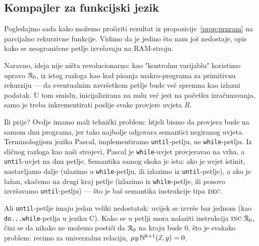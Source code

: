 
\subsection{Kompajler za funkcijski jezik}\label{sec:pir}

Pogledajmo sada kako možemo proširiti rezultat iz propozicije~\ref{prop:prnram} na parcijalno rekurzivne funkcije. Vidimo da je jedino što nam još nedostaje, opis kako se neograničene petlje izvršavaju na RAM-stroju.

Naravno, ideja nije ništa revolucionarno: kao "kontrolnu varijablu" koristimo upravo $\mathcal R_{0}$, iz istog razloga kao kod pisanja makro-programa za primitivnu rekurziju --- da eventualnim završetkom petlje bude već spremna kao izlazni podatak. U tom smislu, inicijalizirana na nulu već jest na početku izračunavanja, samo je treba inkrementirati poslije svake provjere uvjeta $R$.

Ili prije? Ovdje imamo mali tehnički problem: htjeli bismo da provjera bude na samom dnu programa, jer tako najbolje odgovara semantici negiranog uvjeta. Terminologijom jezika Pascal, implementiramo \texttt{until}-petlju, ne \texttt{while}-petlju. Iz sličnog razloga kao naši strojevi, Pascal je \texttt{while}-uvjet provjeravao na vrhu, a \texttt{until}-uvjet na dnu petlje. Semantika samog skoka je ista: ako je uvjet istinit, nastavljamo dalje (ulazimo u \texttt{while}-petlju, ili izlazimo iz \texttt{until}-petlje), a ako je lažan, skačemo na drugi kraj petlje (izlazimo iz \texttt{while}-petlje, ili ponovo izvršavamo \texttt{until}-petlju) --- što je baš semantika instrukcije tipa $\textsc{dec}$.

Ali \texttt{until}-petlje imaju jedan veliki nedostatak: uvijek se izvrše bar jednom (kao \texttt{do...while}-petlja u jeziku C). Kako se u petlji mora nalaziti instrukcija $\textsc{inc}\;\mathcal R_{0}$, čini se da nikako ne možemo postići da $\mathcal R_{0}$ na kraju bude $0$, što je svakako problem: recimo za univerzalnu relaciju, $\mu y\,{\mathbb N}^{k+1}(\vec x,y)=0$.

